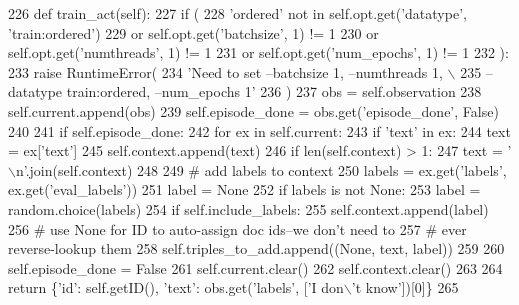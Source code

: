 \begin{DoxyCode}
226     \textcolor{keyword}{def }train\_act(self):
227         \textcolor{keywordflow}{if} (
228             \textcolor{stringliteral}{'ordered'} \textcolor{keywordflow}{not} \textcolor{keywordflow}{in} self.opt.get(\textcolor{stringliteral}{'datatype'}, \textcolor{stringliteral}{'train:ordered'})
229             \textcolor{keywordflow}{or} self.opt.get(\textcolor{stringliteral}{'batchsize'}, 1) != 1
230             \textcolor{keywordflow}{or} self.opt.get(\textcolor{stringliteral}{'numthreads'}, 1) != 1
231             \textcolor{keywordflow}{or} self.opt.get(\textcolor{stringliteral}{'num\_epochs'}, 1) != 1
232         ):
233             \textcolor{keywordflow}{raise} RuntimeError(
234                 \textcolor{stringliteral}{'Need to set --batchsize 1, --numthreads 1, \(\backslash\)}
235 \textcolor{stringliteral}{            --datatype train:ordered, --num\_epochs 1'}
236             )
237         obs = self.observation
238         self.current.append(obs)
239         self.episode\_done = obs.get(\textcolor{stringliteral}{'episode\_done'}, \textcolor{keyword}{False})
240 
241         \textcolor{keywordflow}{if} self.episode\_done:
242             \textcolor{keywordflow}{for} ex \textcolor{keywordflow}{in} self.current:
243                 \textcolor{keywordflow}{if} \textcolor{stringliteral}{'text'} \textcolor{keywordflow}{in} ex:
244                     text = ex[\textcolor{stringliteral}{'text'}]
245                     self.context.append(text)
246                     \textcolor{keywordflow}{if} len(self.context) > 1:
247                         text = \textcolor{stringliteral}{'\(\backslash\)n'}.join(self.context)
248 
249                 \textcolor{comment}{# add labels to context}
250                 labels = ex.get(\textcolor{stringliteral}{'labels'}, ex.get(\textcolor{stringliteral}{'eval\_labels'}))
251                 label = \textcolor{keywordtype}{None}
252                 \textcolor{keywordflow}{if} labels \textcolor{keywordflow}{is} \textcolor{keywordflow}{not} \textcolor{keywordtype}{None}:
253                     label = random.choice(labels)
254                     \textcolor{keywordflow}{if} self.include\_labels:
255                         self.context.append(label)
256                 \textcolor{comment}{# use None for ID to auto-assign doc ids--we don't need to}
257                 \textcolor{comment}{# ever reverse-lookup them}
258                 self.triples\_to\_add.append((\textcolor{keywordtype}{None}, text, label))
259 
260             self.episode\_done = \textcolor{keyword}{False}
261             self.current.clear()
262             self.context.clear()
263 
264         \textcolor{keywordflow}{return} \{\textcolor{stringliteral}{'id'}: self.getID(), \textcolor{stringliteral}{'text'}: obs.get(\textcolor{stringliteral}{'labels'}, [\textcolor{stringliteral}{'I don\(\backslash\)'t know'}])[0]\}
265 
\end{DoxyCode}


